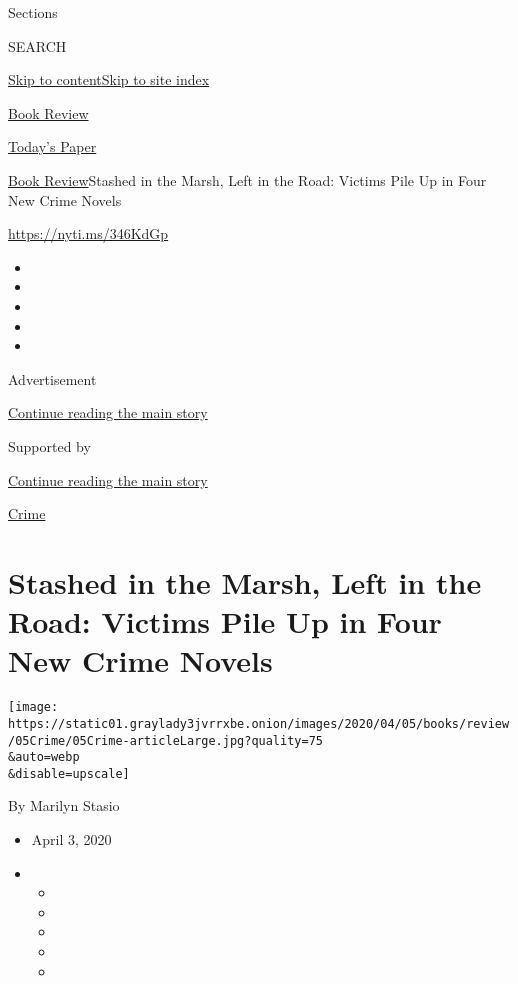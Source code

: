 Sections

SEARCH

\protect\hyperlink{site-content}{Skip to
content}\protect\hyperlink{site-index}{Skip to site index}

\href{https://www.nytimes3xbfgragh.onion/section/books/review}{Book
Review}

\href{https://myaccount.nytimes3xbfgragh.onion/auth/login?response_type=cookie\&client_id=vi}{}

\href{https://www.nytimes3xbfgragh.onion/section/todayspaper}{Today's
Paper}

\href{/section/books/review}{Book Review}\textbar{}Stashed in the Marsh,
Left in the Road: Victims Pile Up in Four New Crime Novels

\url{https://nyti.ms/346KdGp}

\begin{itemize}
\item
\item
\item
\item
\item
\end{itemize}

Advertisement

\protect\hyperlink{after-top}{Continue reading the main story}

Supported by

\protect\hyperlink{after-sponsor}{Continue reading the main story}

\href{/column/crime}{Crime}

\hypertarget{stashed-in-the-marsh-left-in-the-road-victims-pile-up-in-four-new-crime-novels}{%
\section{Stashed in the Marsh, Left in the Road: Victims Pile Up in Four
New Crime
Novels}\label{stashed-in-the-marsh-left-in-the-road-victims-pile-up-in-four-new-crime-novels}}

\texttt{[image: https://static01.graylady3jvrrxbe.onion/images/2020/04/05/books/review/05Crime/05Crime-articleLarge.jpg?quality=75\\\&auto=webp\\\&disable=upscale]}

By Marilyn Stasio

\begin{itemize}
\item
  April 3, 2020
\item
  \begin{itemize}
  \item
  \item
  \item
  \item
  \item
  \end{itemize}
\end{itemize}

